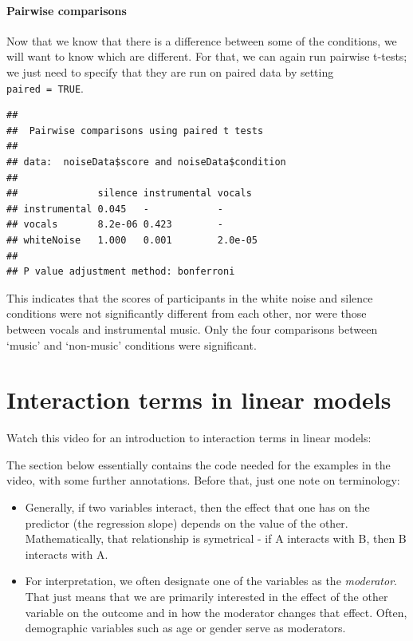 \documentclass[
]{book}
\newenvironment{Shaded}{\begin{snugshade}}{\end{snugshade}}
\newcommand{\DataTypeTok}[1]{\textcolor[rgb]{0.13,0.29,0.53}{#1}}
\newcommand{\KeywordTok}[1]{\textcolor[rgb]{0.13,0.29,0.53}{\textbf{#1}}}
\newcommand{\NormalTok}[1]{#1}
\newcommand{\OperatorTok}[1]{\textcolor[rgb]{0.81,0.36,0.00}{\textbf{#1}}}
\newcommand{\OtherTok}[1]{\textcolor[rgb]{0.56,0.35,0.01}{#1}}
\newcommand{\StringTok}[1]{\textcolor[rgb]{0.31,0.60,0.02}{#1}}
\providecommand{\tightlist}{%
  \setlength{\itemsep}{0pt}\setlength{\parskip}{0pt}}
\begin{document}
\hypertarget{pairwise-comparisons-1}{%
\subsubsection{Pairwise comparisons}\label{pairwise-comparisons-1}}

Now that we know that there is a difference between some of the conditions, we will want to know which are different. For that, we can again run pairwise t-tests; we just need to specify that they are run on paired data by setting \texttt{paired\ =\ TRUE}.

\begin{Shaded}
\end{Shaded}

\begin{verbatim}
## 
## 	Pairwise comparisons using paired t tests 
## 
## data:  noiseData$score and noiseData$condition 
## 
##              silence instrumental vocals 
## instrumental 0.045   -            -      
## vocals       8.2e-06 0.423        -      
## whiteNoise   1.000   0.001        2.0e-05
## 
## P value adjustment method: bonferroni
\end{verbatim}

This indicates that the scores of participants in the white noise and silence conditions were not significantly different from each other, nor were those between vocals and instrumental music. Only the four comparisons between `music' and `non-music' conditions were significant.

\hypertarget{interaction-terms-in-linear-models}{%
\chapter{Interaction terms in linear models}\label{interaction-terms-in-linear-models}}

Watch this video for an introduction to interaction terms in linear models:

The section below essentially contains the code needed for the examples in the video, with some further annotations. Before that, just one note on terminology:

\begin{itemize}
\tightlist
\item
  Generally, if two variables interact, then the effect that one has on the predictor (the regression slope) depends on the value of the other. Mathematically, that relationship is symetrical - if A interacts with B, then B interacts with A.
\item
  For interpretation, we often designate one of the variables as the \emph{moderator}. That just means that we are primarily interested in the effect of the other variable on the outcome and in how the moderator changes that effect. Often, demographic variables such as age or gender serve as moderators.
\end{itemize}
\end{document}

